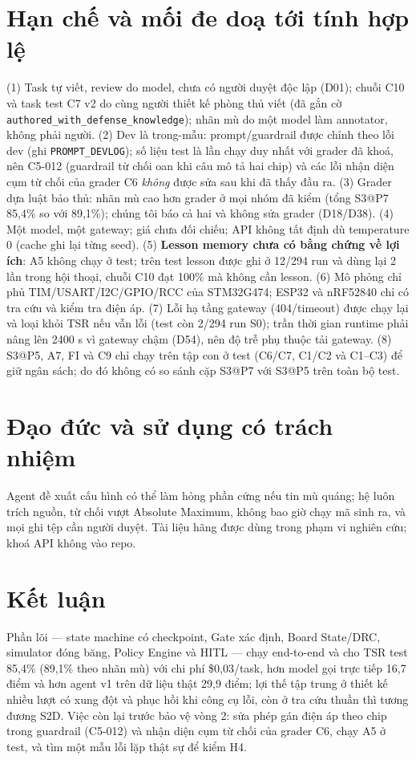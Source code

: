 \documentclass[11pt,a4paper,twocolumn]{article}
\begin{document}
\section{Hạn chế và mối đe doạ tới tính hợp lệ}
(1) Task tự viết, review do model, chưa có người duyệt độc lập (D01); chuỗi C10 và task test C7 v2 do cùng người thiết kế phòng thủ viết (đã gắn cờ \texttt{authored\_with\_defense\_knowledge}); nhãn mù do một model làm annotator, không phải người. (2) Dev là trong-mẫu: prompt/guardrail được chỉnh theo lỗi dev (ghi \texttt{PROMPT\_DEVLOG}); số liệu test là lần chạy duy nhất với grader đã khoá, nên C5-012 (guardrail từ chối oan khi câu mô tả hai chip) và các lỗi nhận diện cụm từ chối của grader C6 \emph{không} được sửa sau khi đã thấy đầu ra. (3) Grader dựa luật bảo thủ: nhãn mù cao hơn grader ở mọi nhóm đã kiểm (tổng S3@P7 85,4\% so với 89,1\%); chúng tôi báo cả hai và không sửa grader (D18/D38). (4) Một model, một gateway; giá chưa đối chiếu; API không tất định dù temperature 0 (cache ghi lại từng seed). (5) \textbf{Lesson memory chưa có bằng chứng về lợi ích}: A5 không chạy ở test; trên test lesson được ghi ở 12/294 run và dùng lại 2 lần trong hội thoại, chuỗi C10 đạt 100\% mà không cần lesson. (6) Mô phỏng chỉ phủ TIM/USART/I2C/GPIO/RCC của STM32G474; ESP32 và nRF52840 chỉ có tra cứu và kiểm tra điện áp. (7) Lỗi hạ tầng gateway (404/timeout) được chạy lại và loại khỏi TSR nếu vẫn lỗi (test còn 2/294 run S0); trần thời gian runtime phải nâng lên 2400 s vì gateway chậm (D54), nên độ trễ phụ thuộc tải gateway. (8) S3@P5, A7, FI và C9 chỉ chạy trên tập con ở test (C6/C7, C1/C2 và C1--C3) để giữ ngân sách; do đó không có so sánh cặp S3@P7 với S3@P5 trên toàn bộ test.

\section{Đạo đức và sử dụng có trách nhiệm}
Agent đề xuất cấu hình có thể làm hỏng phần cứng nếu tin mù quáng; hệ luôn trích nguồn, từ chối vượt Absolute Maximum, không bao giờ chạy mã sinh ra, và mọi ghi tệp cần người duyệt. Tài liệu hãng được dùng trong phạm vi nghiên cứu; khoá API không vào repo.

\section{Kết luận}
Phần lõi --- state machine có checkpoint, Gate xác định, Board State/DRC, simulator đóng băng, Policy Engine và HITL --- chạy end-to-end và cho TSR test 85,4\% (89,1\% theo nhãn mù) với chi phí \$0,03/task, hơn model gọi trực tiếp 16,7 điểm và hơn agent v1 trên dữ liệu thật 29,9 điểm; lợi thế tập trung ở thiết kế nhiều lượt có xung đột và phục hồi khi công cụ lỗi, còn ở tra cứu thuần thì tương đương S2D. Việc còn lại trước bảo vệ vòng 2: sửa phép gán điện áp theo chip trong guardrail (C5-012) và nhận diện cụm từ chối của grader C6, chạy A5 ở test, và tìm một mẫu lỗi lặp thật sự để kiểm H4.
\end{document}
